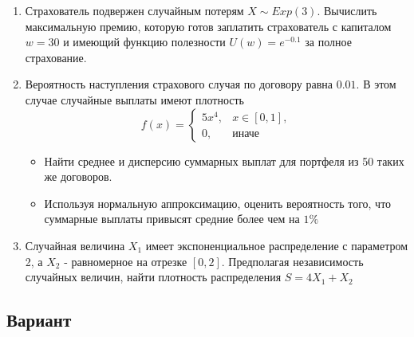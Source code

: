 \documentclass[12pt, letterpaper]{article}
\begin{document}
\begin{enumerate}
	\item 
	

	Страхователь подвержен случайным потерям $X \sim Exp(3)$.
	Вычислить максимальную премию, которую готов заплатить страхователь с капиталом $w=30$ и имеющий функцию полезности $U(w) = e^{-0.1}$ за полное страхование.
	\item
	Вероятность наступления страхового случая по договору равна $0.01$. В этом случае случайные выплаты имеют плотность
	\[
	f(x) = 
	\begin{cases}
		5x^4, & x \in [0, 1],\\
		0, & \text{иначе}
	\end{cases}
	\]
	\begin{itemize}
		\item Найти среднее и дисперсию суммарных выплат для портфеля из 50 таких же договоров.
		\item Используя нормальную аппроксимацию, оценить вероятность того, что суммарные выплаты привысят средние более чем на $1\%$
	\end{itemize}
	
	\item
	Случайная величина $X_1$ имеет экспоненциальное распределение с параметром 2, а $X_2$ - равномерное на отрезке $[0, 2]$.
	Предполагая независимость случайных величин, найти плотность распределения $S = 4X_1 + X_2$
\end{enumerate}


\newpage
\begin{center}
	\section{Вариант}
\end{center}
\end{document}
